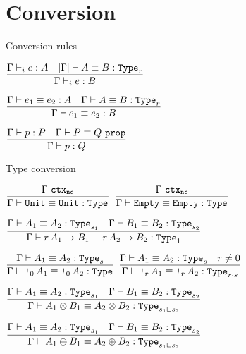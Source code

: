 \section{Conversion}

\begin{frame}{Conversion rules}

\begin{center}
  $\infrule{\typing[\Gamma]{e}{A} \quad \typeconv[\cartesianize{\Gamma}]{A}{B}[r]}{\typing[\Gamma]{e}{B}}$

  \vspace{2em}

  $\infrule{\termconv{e_1}{e_2}{A} \quad \typeconv{A}{B}[r]}{\termconv{e_1}{e_2}{B}}$

  \vspace{2em}

  $\infrule{\proves[\Gamma]{p}{P} \quad \propconv[\Gamma]{P}{Q}}{\proves[\Gamma]{p}{Q}}$
\end{center}

\end{frame}

\begin{frame}{Type conversion}

\begin{center}
  $\infrule{\ctx[\noncomputable]{\Gamma}}{\typeconv{\Unit}{\Unit}}$ \quad
  $\infrule{\ctx[\noncomputable]{\Gamma}}{\typeconv{\Empty}{\Empty}}$

  \vspace{1em}

  $\infrule{\typeconv{A_1}{A_2}[s_1] \quad \typeconv{B_1}{B_2}[s_2]}{\typeconv{\Fun[r]{A_1}{B_1}}{\Fun[r]{A_2}{B_2}}[\One]}$

  \vspace{1em}

  $\infrule{\typeconv{A_1}{A_2}[s]}{\typeconv{\Box[\Zero]{A_1}}{\Box[\Zero]{A_2}}}$ \quad
  $\infrule{\typeconv{A_1}{A_2}[s] \quad r \neq \Zero}{\typeconv{\Box[r]{A_1}}{\Box[r]{A_2}}[\mulqty{r}{s}]}$

  \vspace{1em}

  $\infrule{\typeconv{A_1}{A_2}[s_1] \quad \typeconv{B_1}{B_2}[s_2]}{\typeconv{\Prod{A_1}{B_1}}{\Prod{A_2}{B_2}}[\lubqty{s_1}{s_2}]}$

  \vspace{1em}

  $\infrule{\typeconv{A_1}{A_2}[s_1] \quad \typeconv{B_1}{B_2}[s_2]}{\typeconv{\Sum{A_1}{B_1}}{\Sum{A_2}{B_2}}[\lubqty{s_1}{s_2}]}$
\end{center}

\end{frame}

